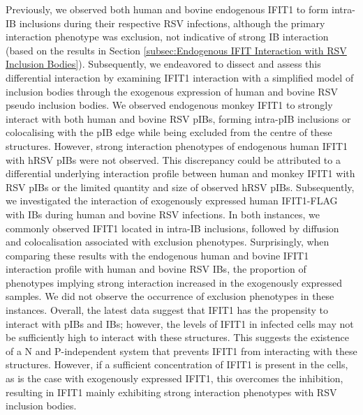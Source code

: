 Previously, we observed both human and bovine endogenous IFIT1 to form intra-IB inclusions during their respective RSV infections, although the primary interaction phenotype was exclusion, not indicative of strong IB interaction (based on the results in Section \ref{subsec:Endogenous IFIT Interaction with RSV Inclusion Bodies}). Subsequently, we endeavored to dissect and assess this differential interaction by examining IFIT1 interaction with a simplified model of inclusion bodies through the exogenous expression of human and bovine RSV pseudo inclusion bodies. We observed endogenous monkey IFIT1 to strongly interact with both human and bovine RSV pIBs, forming intra-pIB inclusions or colocalising with the pIB edge while being excluded from the centre of these structures. However, strong interaction phenotypes of endogenous human IFIT1 with hRSV pIBs were not observed. This discrepancy could be attributed to a differential underlying interaction profile between human and monkey IFIT1 with RSV pIBs or the limited quantity and size of observed hRSV pIBs. Subsequently, we investigated the interaction of exogenously expressed human IFIT1-FLAG with IBs during human and bovine RSV infections. In both instances, we commonly observed IFIT1 located in intra-IB inclusions, followed by diffusion and colocalisation associated with exclusion phenotypes. Surprisingly, when comparing these results with the endogenous human and bovine IFIT1 interaction profile with human and bovine RSV IBs, the proportion of phenotypes implying strong interaction increased in the exogenously expressed samples. We did not observe the occurrence of exclusion phenotypes in these instances. Overall, the latest data suggest that IFIT1 has the propensity to interact with pIBs and IBs; however, the levels of IFIT1 in infected cells may not be sufficiently high to interact with these structures. This suggests the existence of a N and P-independent system that prevents IFIT1 from interacting with these structures. However, if a sufficient concentration of IFIT1 is present in the cells, as is the case with exogenously expressed IFIT1, this overcomes the inhibition, resulting in IFIT1 mainly exhibiting strong interaction phenotypes with RSV inclusion bodies.

